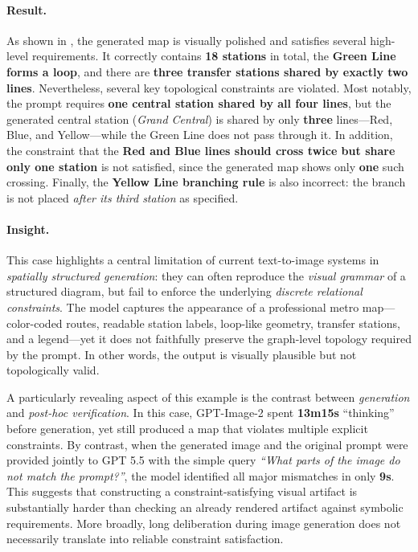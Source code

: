 \paragraph{Result.}
As shown in , the generated map is visually polished and satisfies several high-level requirements. It correctly contains \textbf{18 stations} in total, the \textbf{Green Line forms a loop}, and there are \textbf{three transfer stations shared by exactly two lines}. Nevertheless, several key topological constraints are violated. Most notably, the prompt requires \textbf{one central station shared by all four lines}, but the generated central station (\textit{Grand Central}) is shared by only \textbf{three} lines---Red, Blue, and Yellow---while the Green Line does not pass through it. In addition, the constraint that the \textbf{Red and Blue lines should cross twice but share only one station} is not satisfied, since the generated map shows only \textbf{one} such crossing. Finally, the \textbf{Yellow Line branching rule} is also incorrect: the branch is not placed \emph{after its third station} as specified.

\paragraph{Insight.}
This case highlights a central limitation of current text-to-image systems in \emph{spatially structured generation}: they can often reproduce the \emph{visual grammar} of a structured diagram, but fail to enforce the underlying \emph{discrete relational constraints}. The model captures the appearance of a professional metro map---color-coded routes, readable station labels, loop-like geometry, transfer stations, and a legend---yet it does not faithfully preserve the graph-level topology required by the prompt. In other words, the output is visually plausible but not topologically valid.

A particularly revealing aspect of this example is the contrast between \emph{generation} and \emph{post-hoc verification}. In this case, GPT-Image-2 spent \textbf{13m15s} ``thinking'' before generation, yet still produced a map that violates multiple explicit constraints. By contrast, when the generated image and the original prompt were provided jointly to GPT 5.5 with the simple query \textit{``What parts of the image do not match the prompt?''}, the model identified all major mismatches in only \textbf{9s}. This suggests that constructing a constraint-satisfying visual artifact is substantially harder than checking an already rendered artifact against symbolic requirements. More broadly, long deliberation during image generation does not necessarily translate into reliable constraint satisfaction.

